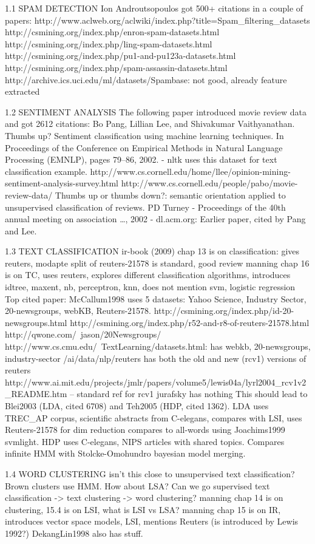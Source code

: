 \documentclass[ignorenonframetext]{beamer}
\begin{document}
1.1 SPAM DETECTION
Ion Androutsopoulos got 500+ citations in a couple of papers:
http://www.aclweb.org/aclwiki/index.php?title=Spam_filtering_datasets
http://csmining.org/index.php/enron-spam-datasets.html
http://csmining.org/index.php/ling-spam-datasets.html
http://csmining.org/index.php/pu1-and-pu123a-datasets.html
http://csmining.org/index.php/spam-assassin-datasets.html
http://archive.ics.uci.edu/ml/datasets/Spambase: not good, already feature extracted

1.2 SENTIMENT ANALYSIS
The following paper introduced movie review data and got 2612 citations:
Bo Pang, Lillian Lee, and Shivakumar Vaithyanathan. Thumbs up? Sentiment classiﬁcation using
machine learning techniques. In Proceedings of the Conference on Empirical Methods in Natural
Language Processing (EMNLP), pages 79–86, 2002.
- nltk uses this dataset for text classification example.
http://www.cs.cornell.edu/home/llee/opinion-mining-sentiment-analysis-survey.html
http://www.cs.cornell.edu/people/pabo/movie-review-data/
Thumbs up or thumbs down?: semantic orientation applied to unsupervised classification of reviews. PD Turney - Proceedings of the 40th annual meeting on association …, 2002 - dl.acm.org: Earlier paper, cited by Pang and Lee.


1.3 TEXT CLASSIFICATION
ir-book (2009) chap 13 is on classification: gives reuters, modapte split of reuters-21578 is standard, good review
manning chap 16 is on TC, uses reuters, explores different classification algorithms, introduces idtree, maxent, nb, perceptron, knn, does not mention svm, logistic regression
Top cited paper: McCallum1998 uses 5 datasets: Yahoo Science, Industry Sector, 20-newsgroups, webKB, Reuters-21578.
http://csmining.org/index.php/id-20-newsgroups.html
http://csmining.org/index.php/r52-and-r8-of-reuters-21578.html
http://qwone.com/~jason/20Newsgroups/
http://www.cs.cmu.edu/~TextLearning/datasets.html: has webkb, 20-newsgroups, industry-sector
/ai/data/nlp/reuters has both the old and new (rcv1) versions of reuters
http://www.ai.mit.edu/projects/jmlr/papers/volume5/lewis04a/lyrl2004_rcv1v2_README.htm -- standard ref for rcv1
jurafsky has nothing
This should lead to Blei2003 (LDA, cited 6708) and Teh2005 (HDP, cited 1362).  LDA uses TREC_AP corpus, scientific abstracts from C-elegans, compares with LSI, uses Reuters-21578 for dim reduction compares to all-words using Joachims1999 svmlight.  HDP uses C-elegans, NIPS articles with shared topics.  Compares infinite HMM with Stolcke-Omohundro bayesian model merging.

1.4 WORD CLUSTERING
isn't this close to unsupervised text classification?
Brown clusters use HMM.
How about LSA?  Can we go supervised text classification -> text clustering -> word clustering?
manning chap 14 is on clustering, 15.4 is on LSI, what is LSI vs LSA?
manning chap 15 is on IR, introduces vector space models, LSI, mentions Reuters (is introduced by Lewis 1992?)
DekangLin1998 also has stuff.
\end{document}
